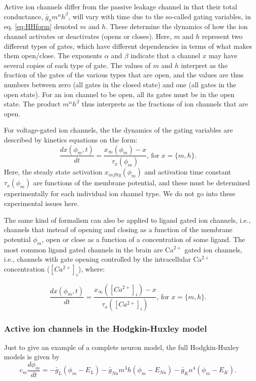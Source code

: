 Active ion channels differ from the passive leakage channel in that their total conductance, $\bar{g}_{x} m^{\alpha} h^{\beta}$, will vary with time due to the so-called gating variables, in eq. \ref{eq:HHform} denoted $m$ and $h$. These determine the dynamics of how the ion channel activates or deactivates (opens or closes). Here, $m$ and $h$ represent two different types of gates, which have different dependencies in terms of what makes them open/close. The exponents $\alpha$ and $\beta$ indicate that a channel $x$ may have several copies of each type of gate. The values of $m$ and $h$ interpret as the fraction of the gates of the various types that are open, and the values are thus numbers between zero (all gates in the closed state) and one (all gates in the open state). For an ion channel to be open, all its gates must be in the open state. The product $m^{\alpha} h^{\beta}$ thus interprets as the fractions of ion channels that are open.

For voltage-gated ion channels, the the dynamics of the gating variables are described by kinetics equations on the form:
\begin{equation}
\frac{dx(\phi_m,t)}{dt} = \frac{x_{\infty}(\phi_m) - x}{\tau_x(\phi_m)},  \, \text{for } x = \{m,h\}.
\label{eq:HHgate}
\end{equation}
Here, the steady state activation $x_{inflty}(\phi_m)$ and activation time constant $\tau_x(\phi_m)$ are functions of the membrane potential, and these must be determined experimentally for each individual ion channel type. We do not go into these experimental issues here. 

The same kind of formalism can also be applied to ligand gated ion channels, i.e., channels that instead of opening and closing as a function of the membrane potential $\phi_m$, open or close as a function of a concentration of some ligand. The most common ligand gated channels in the brain are Ca$^{2+}$ gated ion channels, i.e., channels with gate opening controlled by the intracellular Ca$^{2+}$ concentration ($[Ca^{2+}]_i$), where:

\begin{equation}
\frac{dx(\phi_m,t)}{dt} = \frac{x_{\infty}([Ca^{2+}]_i) - x}{\tau_x([Ca^{2+}]_i)},  \, \text{for } x = \{m,h\}.
\label{eq:HHgateCa}
\end{equation}


\subsubsection{Active ion channels in the Hodgkin-Huxley model}
Just to give an example of a complete neuron model, the full Hodgkin-Huxley models is given by
\begin{equation}
c_m \frac{d\phi_m}{dt} = -\bar{g}_L(\phi_m-E_L) - \bar{g}_{Na} m^3 h (\phi_m - E_{Na}) - \bar{g}_{K} n^4 (\phi_m - E_{K}).
\label{eq:HHfull}
\end{equation}

